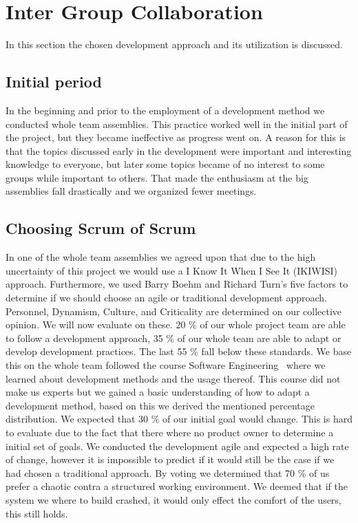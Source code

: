 \section{Inter Group Collaboration}
\label{sec:intergroup}
In this section the chosen development approach and its utilization is discussed. 

\subsection{Initial period}
In the beginning and prior to the employment of a development method we conducted whole team assemblies. 
This practice worked well in the initial part of the project, but they became ineffective as progress went on. 
A reason for this is that the topics discussed early in the development were important and interesting knowledge to everyone, but later some topics became of no interest to some groups while important to others.
That made the enthusiasm at the big assemblies fall drastically and we organized fewer meetings.


\subsection{Choosing Scrum of Scrum}
In one of the whole team assemblies we agreed upon that due to the high uncertainty of this project we would use a I Know It When I See It (IKIWISI) approach. 
Furthermore, we used Barry Boehm and Richard Turn's five factors to determine if we should choose an agile or traditional development approach. 
Personnel, Dynamism, Culture, and Criticality are determined on our collective opinion. 
We will now evaluate on these.    
20 \% of our whole project team are able to follow a development approach, 35 \% of our whole team are able to adapt or develop development practices. 
The last 55 \% fall below these standards.
We base this on the whole team followed the course Software Engineering~\cite[S. 4.4.2]{sw6studieordning} where we learned about development methods and the usage thereof. 
This course did not make us experts but we gained a basic understanding of how to adapt a development method, based on this we derived the mentioned percentage distribution.  
We expected that 30 \% of our initial goal would change.
This is hard to evaluate due to the fact that there where no product owner to determine a initial set of goals.
We conducted the development agile and expected a high rate of change, however it is impossible to predict if it would still be the case if we had chosen a traditional approach.  
By voting we determined that 70 \% of us prefer a chaotic contra a structured working environment.
We deemed that if the system we where to build crashed, it would only effect the comfort of the users, this still holds.

